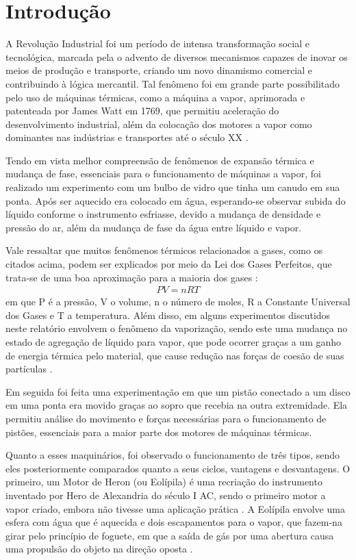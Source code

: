 \section{Introdução}


A Revolução Industrial foi um período de intensa transformação social e tecnológica, marcada pela o advento de diversos mecanismos capazes de inovar os meios de produção e transporte, criando um novo dinamismo comercial e contribuindo à lógica mercantil. Tal fenômeno foi em grande parte possibilitado pelo uso de máquinas térmicas, como a máquina a vapor, aprimorada e patenteada por James Watt em 1769, que permitiu aceleração do desenvolvimento industrial, além da colocação dos motores a vapor como dominantes nas indústrias e transportes até o século XX \cite{HistoriaEM}.

Tendo em vista melhor compreensão de fenômenos de expansão térmica e mudança de fase, essenciais para o funcionamento de máquinas a vapor, foi realizado um experimento com um bulbo de vidro que tinha um canudo em sua ponta. Após ser aquecido era colocado em água, esperando-se observar subida do líquido conforme o instrumento esfriasse, devido a mudança de densidade e pressão do ar, além da mudança de fase da água entre líquido e vapor.

Vale ressaltar que muitos fenômenos térmicos relacionados a gases, como os citados acima, podem ser explicados por meio da Lei dos Gases Perfeitos, que trata-se de uma boa aproximação para a maioria dos gases \cite{Nussenzveig_2014}:
\begin{align*}
    PV = nRT
\end{align*}
em que P é a pressão, V o volume, n o número de moles, R a Constante Universal dos Gases e T a temperatura. Além disso, em alguns experimentos discutidos neste relatório envolvem o fenômeno da vaporização, sendo este uma mudança no estado de agregação de líquido para vapor, que pode ocorrer graças a um ganho de energia térmica pelo material, que cause redução nas forças de coesão de suas partículas \cite{FisicaEM}.

Em seguida foi feita uma experimentação em que um pistão conectado a um disco em uma ponta era movido graças ao sopro que recebia na outra extremidade. Ela permitiu análise do movimento e forças necessárias para o funcionamento de pistões, essenciais para a maior parte dos motores de máquinas térmicas.

Quanto a esses maquinários, foi observado o funcionamento de três tipos, sendo eles posteriormente comparados quanto a seus ciclos, vantagens e desvantagens. O primeiro, um Motor de Heron (ou Eolípila) é uma recriação do instrumento inventado por Hero de Alexandria do século I AC, sendo o primeiro motor a vapor criado, embora não tivesse uma aplicação prática \cite{Enciclopedia}. A Eolípila envolve uma esfera com água que é aquecida e dois escapamentos para o vapor, que fazem-na girar pelo princípio de foguete, em que a saída de gás por uma abertura causa uma propulsão do objeto na direção oposta \cite{Nasa}.

